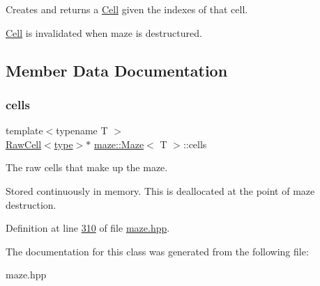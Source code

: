 Creates and returns a \hyperlink{classmaze_1_1Cell}{Cell} given the indexes of that cell. 

\hyperlink{classmaze_1_1Cell}{Cell} is invalidated when maze is destructured. 

\subsection{Member Data Documentation}
\mbox{\label{classmaze_1_1Maze_acafe6a6b48339133143ec0ddd7119bcf}} 
\subsubsection{\texorpdfstring{cells}{cells}}
{\footnotesize\ttfamily template$<$typename T $>$ \\
\hyperlink{classmaze_1_1RawCell}{Raw\+Cell}$<$\hyperlink{classmaze_1_1Maze_a9f056be7a10507d578e4608e31a3d6fc}{type}$>$$\ast$ \hyperlink{classmaze_1_1Maze}{maze\+::\+Maze}$<$ T $>$\+::cells\hspace{0.3cm}{\ttfamily [protected]}}



The raw cells that make up the maze. 

Stored continuously in memory. This is deallocated at the point of maze destruction. 

Definition at line \hyperlink{maze_8hpp_source_l00310}{310} of file \hyperlink{maze_8hpp_source}{maze.\+hpp}.



The documentation for this class was generated from the following file\+:\begin{DoxyCompactItemize}
\item 
maze.\+hpp\end{DoxyCompactItemize}

